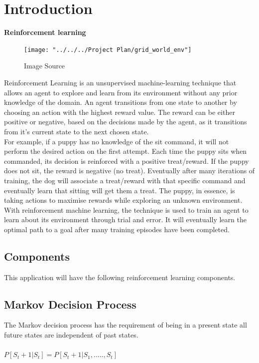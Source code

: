 \chapter{Introduction}
\textbf{Reinforcement learning}\\
\begin{figure}[H]
	\centering
	\texttt{[image: "../../../Project Plan/grid\_world\_env"]}
	\caption{Image Source~\cite{GridWorl45:online}}
	\label{fig:gridworldenv}

\end{figure}
Reinforcement Learning is an unsupervised machine-learning technique that allows an agent to explore and learn from its environment without any prior knowledge of the domain. 
An agent transitions from one state to another by choosing an action with the highest reward value. The reward can be either positive or negative, based on the decisions made by the agent, as it transitions from it's current state to the next chosen state.\\
For example, if a puppy has no knowledge of the sit command, it will not perform the desired action on the first attempt. Each time the puppy sits when commanded, its decision is reinforced with a positive treat/reward. If the puppy does not sit, the reward is negative (no treat). Eventually after many iterations of training, the dog will associate a treat/reward with that specific command and eventually learn that sitting will get them a treat. 
The puppy, in essence, is taking actions to maximise rewards while exploring an unknown environment.\\
With reinforcement machine learning, the technique is used to train an agent to learn about its environment through trial and error. It will eventually learn the optimal path to a goal after many training episodes have been completed.

\section{Components}
This application will have the following reinforcement learning components.

\section{Markov Decision Process}
The Markov decision process has the requirement of being in a present state all future states are independent of past states.\\\\
$P[S_{t}+1 | S_{t}] = P[S_{t}+1 | S_{1}, ..... , S_{t}]$\\\\

